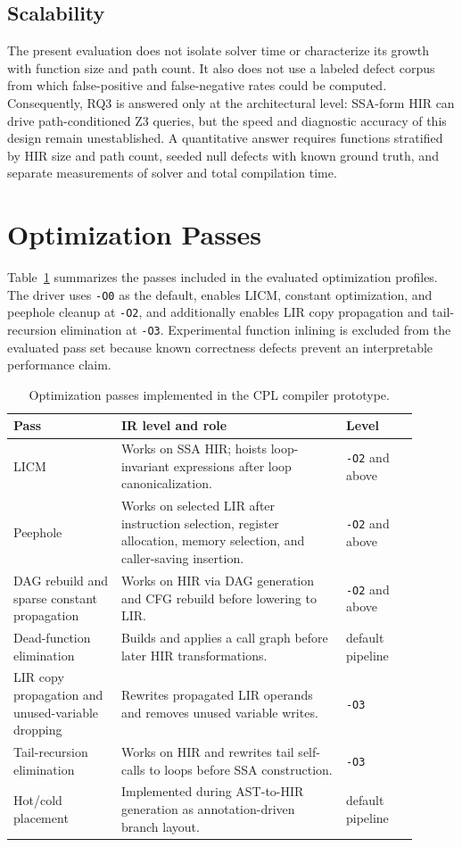 \documentclass[10pt,twocolumn]{article}
\begin{document}
\subsection{Scalability}

\par The present evaluation does not isolate solver time or characterize its growth with function size and path count. It also does not use a labeled defect corpus from which false-positive and false-negative rates could be computed. Consequently, RQ3 is answered only at the architectural level: SSA-form HIR can drive path-conditioned Z3 queries, but the speed and diagnostic accuracy of this design remain unestablished. A quantitative answer requires functions stratified by HIR size and path count, seeded null defects with known ground truth, and separate measurements of solver and total compilation time.

\section{Optimization Passes}

\par Table~\ref{tab:optimizations} summarizes the passes included in the evaluated optimization profiles. The driver uses \texttt{-O0} as the default, enables LICM, constant optimization, and peephole cleanup at \texttt{-O2}, and additionally enables LIR copy propagation and tail-recursion elimination at \texttt{-O3}. Experimental function inlining is excluded from the evaluated pass set because known correctness defects prevent an interpretable performance claim.

\begin{table}[t]
\centering
\caption{Optimization passes implemented in the CPL compiler prototype.}
\label{tab:optimizations}
\begin{tabular}{p{0.24\linewidth}p{0.50\linewidth}p{0.16\linewidth}}
\toprule
Pass & IR level and role & Level \\
\midrule
LICM & Works on SSA HIR; hoists loop-invariant expressions after loop canonicalization. & \texttt{-O2} and above \\
Peephole & Works on selected LIR after instruction selection, register allocation, memory selection, and caller-saving insertion. & \texttt{-O2} and above \\
DAG rebuild and sparse constant propagation & Works on HIR via DAG generation and CFG rebuild before lowering to LIR. & \texttt{-O2} and above \\
Dead-function elimination & Builds and applies a call graph before later HIR transformations. & default pipeline \\
LIR copy propagation and unused-variable dropping & Rewrites propagated LIR operands and removes unused variable writes. & \texttt{-O3} \\
Tail-recursion elimination & Works on HIR and rewrites tail self-calls to loops before SSA construction. & \texttt{-O3} \\
Hot/cold placement & Implemented during AST-to-HIR generation as annotation-driven branch layout. & default pipeline \\
\bottomrule
\end{tabular}
\end{table}
\end{document}
